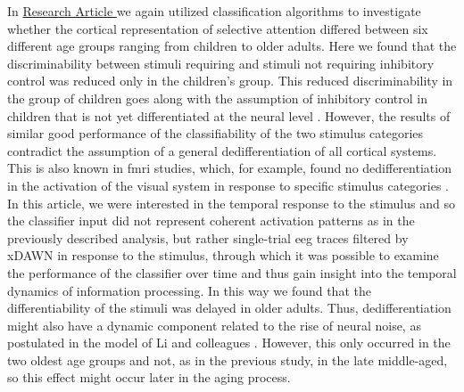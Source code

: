 In \hyperref[results:paperII]{Research Article } we again utilized classification algorithms to investigate whether the cortical representation of selective attention differed between six different age groups ranging from children to older adults. Here we found that the discriminability between stimuli requiring and stimuli not requiring inhibitory control was reduced only in the children's group. This reduced discriminability in the group of children goes along with the assumption of inhibitory control in children that is not yet differentiated at the neural level \cite{Waszak2010,Reuter2019}. However, the results of similar good performance of the classifiability of the two stimulus categories contradict the assumption of a general dedifferentiation of all cortical systems. This is also known in \gls{fmri} studies, which, for example, found no dedifferentiation in the activation of the visual system in response to specific stimulus categories \cite{Voss2008}. In this article, we were interested in the temporal response to the stimulus and so the classifier input did not represent coherent activation patterns as in the previously described analysis, but rather single-trial \gls{eeg} traces filtered by xDAWN in response to the stimulus, through which it was possible to examine the performance of the classifier over time and thus gain insight into the temporal dynamics of information processing. In this way we found that the differentiability of the stimuli was delayed in older adults. Thus, dedifferentiation might also have a dynamic component related to the rise of neural noise, as postulated in the model of Li and colleagues \cite{Li2001,Li2000}. However, this only occurred in the two oldest age groups and not, as in the previous study, in the late middle-aged, so this effect might occur later in the aging process. 

